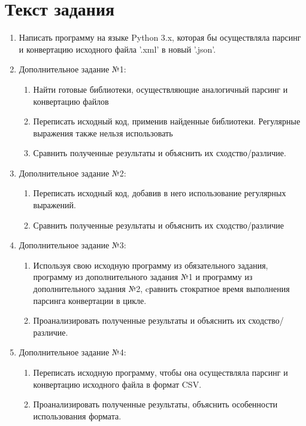\section{Текст задания}

\begin{enumerate} 
  \item Написать программу на языке Python 3.x, которая бы осуществляла парсинг и конвертацию исходного файла '.xml' в новый '.json'.
  \item Дополнительное задание №1:  
    \begin{enumerate} 
        \item Найти готовые библиотеки, осуществляющие аналогичный парсинг и конвертацию файлов
        \item Переписать исходный код, применив найденные библиотеки. Регулярные выражения также нельзя использовать
        \item Сравнить полученные результаты и объяснить их сходство/различие.
    \end{enumerate} 
  \item Дополнительное задание №2:  
    \begin{enumerate} 
        \item Переписать исходный код, добавив в него использование регулярных выражений.
        \item Сравнить полученные результаты и объяснить их сходство/различие
    \end{enumerate} 
  \item Дополнительное задание №3:  
    \begin{enumerate} 
        \item Используя свою исходную программу из обязательного задания, программу из дополнительного задания №1 и программу из дополнительного задания №2, cравнить стократное время выполнения парсинга конвертации в цикле.
        \item Проанализировать полученные результаты и объяснить их сходство/различие.
    \end{enumerate}
  \item Дополнительное задание №4:  
    \begin{enumerate} 
        \item Переписать исходную программу, чтобы она осуществляла парсинг и конвертацию исходного файла в формат CSV.
        \item Проанализировать полученные результаты, объяснить особенности использования формата.
    \end{enumerate} 
\end{enumerate}